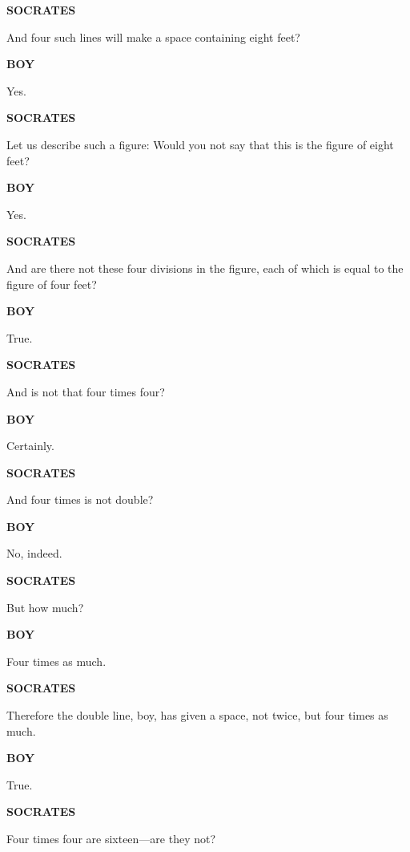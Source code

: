\documentclass[11pt,letter]{article}
\begin{document}
\par \textbf{SOCRATES}
\par   And four such lines will make a space containing eight feet?

\par \textbf{BOY}
\par   Yes.

\par \textbf{SOCRATES}
\par   Let us describe such a figure:  Would you not say that this is the figure of eight feet?

\par \textbf{BOY}
\par   Yes.

\par \textbf{SOCRATES}
\par   And are there not these four divisions in the figure, each of which is equal to the figure of four feet?

\par \textbf{BOY}
\par   True.

\par \textbf{SOCRATES}
\par   And is not that four times four?

\par \textbf{BOY}
\par   Certainly.

\par \textbf{SOCRATES}
\par   And four times is not double?

\par \textbf{BOY}
\par   No, indeed.

\par \textbf{SOCRATES}
\par   But how much?

\par \textbf{BOY}
\par   Four times as much.

\par \textbf{SOCRATES}
\par   Therefore the double line, boy, has given a space, not twice, but four times as much.

\par \textbf{BOY}
\par   True.

\par \textbf{SOCRATES}
\par   Four times four are sixteen—are they not?
\end{document}
